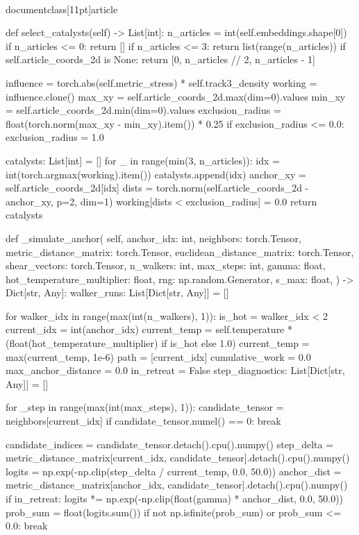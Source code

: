 \\documentclass[11pt]{article}
\begin{document}
\begin{CodeBlock}
    def select_catalysts(self) -> List[int]:
        n_articles = int(self.embeddings.shape[0])
        if n_articles <= 0:
            return []
        if n_articles <= 3:
            return list(range(n_articles))
        if self.article_coords_2d is None:
            return [0, n_articles // 2, n_articles - 1]

        influence = torch.abs(self.metric_stress) * self.track3_density
        working = influence.clone()
        max_xy = self.article_coords_2d.max(dim=0).values
        min_xy = self.article_coords_2d.min(dim=0).values
        exclusion_radius = float(torch.norm(max_xy - min_xy).item()) * 0.25
        if exclusion_radius <= 0.0:
            exclusion_radius = 1.0

        catalysts: List[int] = []
        for _ in range(min(3, n_articles)):
            idx = int(torch.argmax(working).item())
            catalysts.append(idx)
            anchor_xy = self.article_coords_2d[idx]
            dists = torch.norm(self.article_coords_2d - anchor_xy, p=2, dim=1)
            working[dists < exclusion_radius] = 0.0
        return catalysts

    def _simulate_anchor(
        self,
        anchor_idx: int,
        neighbors: torch.Tensor,
        metric_distance_matrix: torch.Tensor,
        euclidean_distance_matrix: torch.Tensor,
        shear_vectors: torch.Tensor,
        n_walkers: int,
        max_steps: int,
        gamma: float,
        hot_temperature_multiplier: float,
        rng: np.random.Generator,
        s_max: float,
    ) -> Dict[str, Any]:
        walker_runs: List[Dict[str, Any]] = []

        for walker_idx in range(max(int(n_walkers), 1)):
            is_hot = walker_idx < 2
            current_idx = int(anchor_idx)
            current_temp = self.temperature * (float(hot_temperature_multiplier) if is_hot else 1.0)
            current_temp = max(current_temp, 1e-6)
            path = [current_idx]
            cumulative_work = 0.0
            max_anchor_distance = 0.0
            in_retreat = False
            step_diagnostics: List[Dict[str, Any]] = []

            for _step in range(max(int(max_steps), 1)):
                candidate_tensor = neighbors[current_idx]
                if candidate_tensor.numel() == 0:
                    break

                candidate_indices = candidate_tensor.detach().cpu().numpy()
                step_delta = metric_distance_matrix[current_idx, candidate_tensor].detach().cpu().numpy()
                logits = np.exp(-np.clip(step_delta / current_temp, 0.0, 50.0))
                anchor_dist = metric_distance_matrix[anchor_idx, candidate_tensor].detach().cpu().numpy()
                if in_retreat:
                    logits *= np.exp(-np.clip(float(gamma) * anchor_dist, 0.0, 50.0))
                prob_sum = float(logits.sum())
                if not np.isfinite(prob_sum) or prob_sum <= 0.0:
                    break


\end{CodeBlock}
\end{document}
